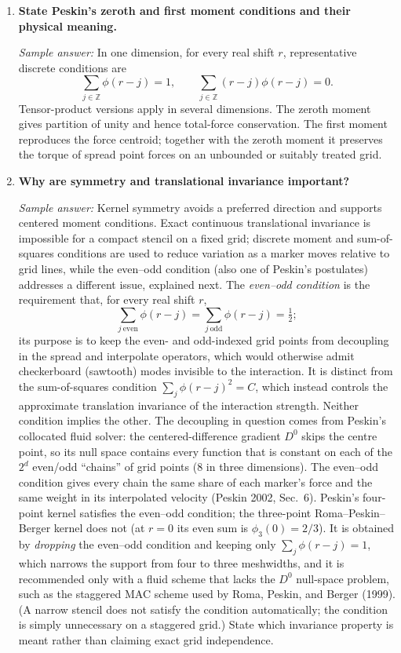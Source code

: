 \documentclass[11pt]{article}
\begin{document}
\begin{enumerate}[label=\arabic*., resume]

\item \textbf{State Peskin’s zeroth and first moment conditions and their physical meaning.}

\textit{Sample answer:}  
In one dimension, for every real shift $r$, representative discrete conditions
are
\[
\sum_{j\in\mathbb{Z}}\phi(r-j)=1,
\qquad
\sum_{j\in\mathbb{Z}}(r-j)\phi(r-j)=0.
\]
Tensor-product versions apply in several dimensions. The zeroth moment gives
partition of unity and hence total-force conservation. The first moment
reproduces the force centroid; together with the zeroth moment it preserves the
torque of spread point forces on an unbounded or suitably treated grid.

\item \textbf{Why are symmetry and translational invariance important?}

\textit{Sample answer:}  
Kernel symmetry avoids a preferred direction and supports centered moment
conditions. Exact continuous translational invariance is impossible for a
compact stencil on a fixed grid; discrete moment and sum-of-squares
conditions are used to reduce variation as a marker moves relative to grid
lines, while the even--odd condition (also one of Peskin's postulates) addresses
a different issue, explained next. The \emph{even--odd condition} is the requirement that, for every real
shift $r$,
\[
\sum_{j\ \mathrm{even}}\phi(r-j)
=\sum_{j\ \mathrm{odd}}\phi(r-j)=\tfrac12 ;
\]
its purpose is to keep the even- and odd-indexed grid points from decoupling in
the spread and interpolate operators, which would otherwise admit checkerboard
(sawtooth) modes invisible to the interaction. It is distinct from the
sum-of-squares condition $\sum_j\phi(r-j)^2=C$, which instead controls the
approximate translation invariance of the interaction strength. Neither
condition implies the other. The decoupling in question comes from Peskin's
collocated fluid solver: the centered-difference gradient $D^0$ skips the
centre point, so its null space contains every function that is constant on
each of the $2^d$ even/odd ``chains'' of grid points (8 in three dimensions).
The even--odd condition gives every chain the same share of each marker's force
and the same weight in its interpolated velocity (Peskin 2002, Sec.~6). Peskin's
four-point kernel satisfies the even--odd condition; the three-point
Roma--Peskin--Berger kernel does not (at $r=0$ its even sum is
$\phi_3(0)=2/3$). It is obtained by \emph{dropping} the even--odd condition and
keeping only $\sum_j\phi(r-j)=1$, which narrows the support from four to three
meshwidths, and it is recommended only with a fluid scheme that lacks the $D^0$
null-space problem, such as the staggered MAC scheme used by Roma, Peskin, and
Berger (1999). (A narrow stencil does not satisfy the condition automatically;
the condition is simply unnecessary on a staggered grid.) State which invariance property is meant
rather than claiming exact grid independence.


\end{enumerate}
\end{document}
